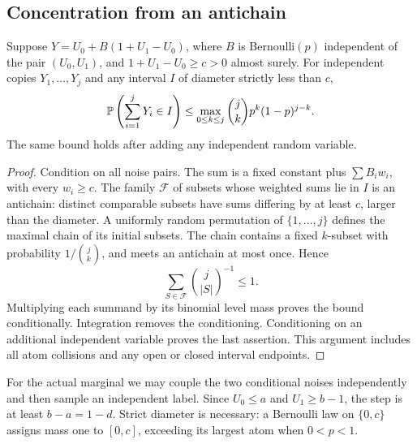 \subsection{Concentration from an antichain}
\begin{lemma}
Suppose $Y=U_0+B(1+U_1-U_0)$, where $B$ is Bernoulli$(p)$ independent
of the pair $(U_0,U_1)$, and $1+U_1-U_0\ge c>0$ almost surely.
For independent copies $Y_1,\ldots,Y_j$ and any interval $I$ of diameter
strictly less than $c$,
\[
 \mathbb P\left(\sum_{i=1}^jY_i\in I\right)
 \le \max_{0\le k\le j}\binom jk p^k(1-p)^{j-k}.
\]
The same bound holds after adding any independent random variable.
\end{lemma}
\begin{proof}
Condition on all noise pairs. The sum is a fixed constant plus
$\sum B_iw_i$, with every $w_i\ge c$. The family $\mathcal F$ of subsets
whose weighted sums lie in $I$ is an antichain: distinct comparable
subsets have sums differing by at least $c$, larger than the diameter.
A uniformly random permutation of $\{1,\ldots,j\}$ defines the maximal
chain of its initial subsets. The chain contains a fixed $k$-subset with
probability $1/\binom jk$, and meets an antichain at most once. Hence
\[
 \sum_{S\in\mathcal F}\binom j{|S|}^{-1}\le1.
\]
Multiplying each summand by its binomial level mass proves the bound
conditionally. Integration removes the conditioning. Conditioning on an
additional independent variable proves the last assertion. This argument
includes all atom collisions and any open or closed interval endpoints.
\end{proof}
For the actual marginal we may couple the two conditional noises
independently and then sample an independent label. Since $U_0\le a$ and
$U_1\ge b-1$, the step is at least $b-a=1-d$.
Strict diameter is necessary: a Bernoulli law on $\{0,c\}$ assigns mass
one to $[0,c]$, exceeding its largest atom when $0<p<1$.

